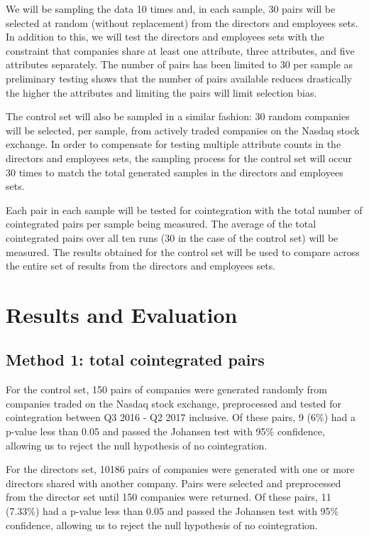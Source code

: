 \documentclass{UoYCSproject}
\begin{document}
We will be sampling the data 10 times and, in each sample, 30 pairs will be selected at random (without replacement) from the directors and employees sets. In addition to this, we will test the directors and employees sets with the constraint that companies share at least one attribute, three attributes, and five attributes separately. The number of pairs has been limited to 30 per sample as preliminary testing shows that the number of pairs available reduces drastically the higher the attributes and limiting the pairs will limit selection bias. 

The control set will also be sampled in a similar fashion: 30 random companies will be selected, per sample, from actively traded companies on the Nasdaq stock exchange. In order to compensate for testing multiple attribute counts in the directors and employees sets, the sampling process for the control set will occur 30 times to match the total generated samples in the directors and employees sets.

Each pair in each sample will be tested for cointegration with the total number of cointegrated pairs per sample being measured. The average of the total cointegrated pairs over all ten runs (30 in the case of the control set) will be measured. The results obtained for the control set will be used to compare across the entire set of results from the directors and employees sets.

\chapter{Results and Evaluation}
\label{cha:Results and Evaluation}

\section{Method 1: total cointegrated pairs}

For the control set, 150 pairs of companies were generated randomly from companies traded on the Nasdaq stock exchange, preprocessed and tested for cointegration between Q3 2016 - Q2 2017 inclusive. Of these pairs, 9 (6\%) had a p-value less than 0.05 and passed the Johansen test with 95\% confidence, allowing us to reject the null hypothesis of no cointegration.

For the directors set, 10186 pairs of companies were generated with one or more directors shared with another company. Pairs were selected and preprocessed from the director set until 150 companies were returned. Of these pairs, 11 (7.33\%) had a p-value less than 0.05 and passed the Johansen test with 95\% confidence, allowing us to reject the null hypothesis of no cointegration.
\end{document}
